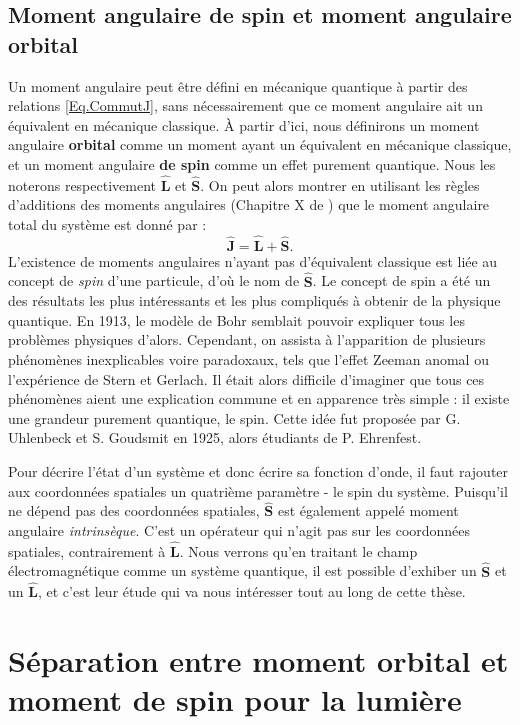 \subsection{Moment angulaire de spin et moment angulaire orbital}
Un moment angulaire peut être défini en mécanique quantique à partir des relations \ref{Eq.CommutJ}, sans nécessairement que ce moment angulaire ait un équivalent en mécanique classique. \`A partir d'ici, nous définirons un moment angulaire \textbf{orbital} comme un moment ayant un équivalent en mécanique classique, et un moment angulaire \textbf{de spin} comme un effet purement quantique. Nous les noterons respectivement $\bm{\hat{L}}$ et $\bm{\hat{S}}$. On peut alors montrer en utilisant les règles d'additions des moments angulaires (Chapitre X de ) que le moment angulaire total du système est donné par :
\begin{equation}
\bm{\hat{J}}=\bm{\hat{L}}+\bm{\hat{S}}.
\label{Eq.JegalLplusS}
\end{equation}
L'existence de moments angulaires n'ayant pas d'équivalent classique est liée au concept de \textit{spin} d'une particule, d'où le nom de $\bm{\hat{S}}$. Le concept de spin a été un des résultats les plus intéressants et les plus compliqués à obtenir de la physique quantique. En 1913, le modèle de Bohr semblait pouvoir expliquer tous les problèmes physiques d'alors. Cependant, on assista à l'apparition de plusieurs phénomènes inexplicables voire paradoxaux, tels que l'effet Zeeman anomal ou l'expérience de Stern et Gerlach. Il était alors difficile d'imaginer que tous ces phénomènes aient une explication commune et en apparence très simple : il existe une grandeur purement quantique, le spin. Cette idée fut proposée par G. Uhlenbeck et S. Goudsmit en 1925, alors étudiants de P. Ehrenfest. 

Pour décrire l'état d'un système et donc écrire sa fonction d'onde, il faut rajouter aux coordonnées spatiales un quatrième paramètre - le spin du système. Puisqu'il ne dépend pas des coordonnées spatiales, $\bm{\hat{S}}$ est également appelé moment angulaire \textit{intrinsèque}. C'est un opérateur qui n'agit pas sur les coordonnées spatiales, contrairement à $\bm{\hat{L}}$. 
Nous verrons qu'en traitant le champ électromagnétique comme un système quantique, il est possible d'exhiber un $\bm{\hat{S}}$ et un $\bm{\hat{L}}$, et c'est leur étude qui va nous intéresser tout au long de cette thèse.

\section{Séparation entre moment orbital et moment de spin pour la lumière}

